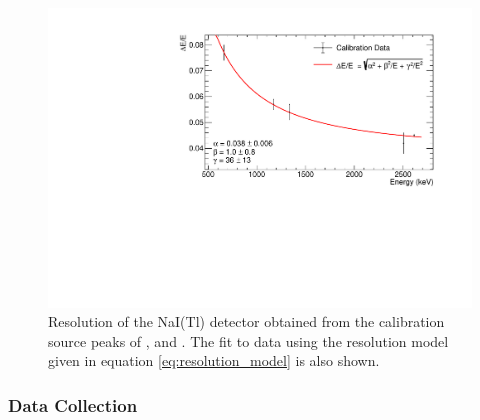 \begin{figure}[]
    \centering
    \includegraphics[scale=0.75]{Chapter_3/Figures/NaI_resolution.pdf}
    \caption[Resolution of the NaI(Tl) detector obtained from the calibration source peaks of \CoSZ{}, \CsOTS{} and \ThTTE{}.]
    {Resolution of the NaI(Tl) detector obtained from the calibration source peaks of \CoSZ{}, \CsOTS{} and \ThTTE{}. The fit to data using the resolution model given in equation \ref{eq:resolution_model} is also shown.}
    \label{fig:detector_resolution_fit}
\end{figure}
%


\subsubsection{Data Collection}
\label{secsec:data_collection}

